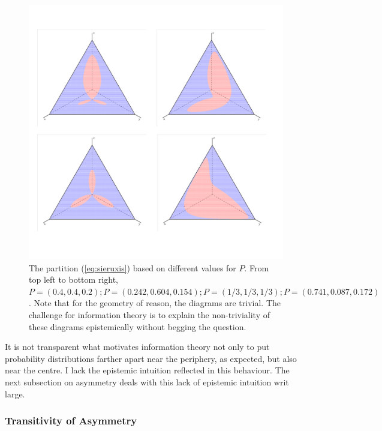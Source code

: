 \documentclass[12pt]{article}
\begin{document}
\begin{figure}[H]
  \begin{flushright}
    \begin{minipage}[h]{\linewidth}
      \includegraphics[width=\textwidth]{concat2.png}
      \caption{\footnotesize The partition (\ref{eq:sieruxis}) based
        on different values for $P$. From top left to bottom right,
        $P=(0.4,0.4,0.2); P=(0.242,0.604,0.154); P=(1/3,1/3,1/3);
        P=(0.741,0.087,0.172)$.
        Note that for the geometry of reason, the diagrams are
        trivial. The challenge for information theory is to explain
        the non-triviality of these diagrams epistemically without
        begging the question.}
      \label{fig:concat}
    \end{minipage}
  \end{flushright}
\end{figure}

It is not transparent what motivates information theory not only to
put probability distributions farther apart near the periphery, as
expected, but also near the centre. I lack the epistemic intuition
reflected in this behaviour. The next subsection on asymmetry deals
with this lack of epistemic intuition writ large.

\subsubsection{Transitivity of Asymmetry}
\label{subsubsec:Asymmetry}
\end{document}
